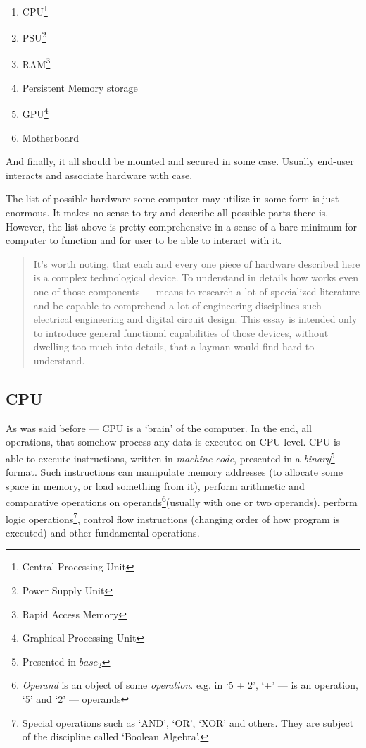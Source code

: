 \documentclass[../../what-is-computer.tex]{subfiles}
\begin{document}
    \begin{enumerate}
        \item CPU\footnote{Central Processing Unit}
        \item PSU\footnote{Power Supply Unit}
        \item RAM\footnote{Rapid Access Memory}
        \item Persistent Memory storage
        \item GPU\footnote{Graphical Processing Unit}
        \item Motherboard
    \end{enumerate}
    And finally, it all should be mounted and secured in some case. Usually end-user interacts and associate hardware with case. \par

    The list of possible hardware some computer may utilize in some form is just enormous. It makes no sense to try and describe all possible parts there is.
    However, the list above is pretty comprehensive in a sense of a bare minimum for computer to function and for user to be able to interact with it. \par

    \begin{quote}
        It's worth noting, that each and every one piece of hardware described here is a complex technological device. To understand in details how works even
        one of those components --- means to research a lot of specialized literature and be capable to comprehend a lot of engineering disciplines such 
        electrical engineering and digital circuit design. This essay is intended only to introduce general functional capabilities of those devices, without
        dwelling too much into details, that a layman would find hard to understand.
    \end{quote}

    \subsection{CPU}\label{subsection:cpu}

    As was said before --- CPU is a `brain' of the computer. In the end, all operations, that somehow process any data is executed on CPU level. CPU is able to
    execute instructions, written in \emph{machine code}, presented in a \emph{binary}\footnote{Presented in $base_2$} format. Such instructions can manipulate
    memory addresses (to allocate some space in memory, or load something from it), perform arithmetic and comparative operations on 
    operands\footnote{\emph{Operand} is an object of some \emph{operation}. e.g. in `5 + 2', `+' --- is an operation, `5' and `2' --- operands}(usually with one or two operands).
    perform logic operations\footnote{Special operations such as `AND', `OR', `XOR' and others. They are subject of the discipline called `Boolean Algebra'.}, control
    flow instructions (changing order of how program is executed) and other fundamental operations. \par
\end{document}
